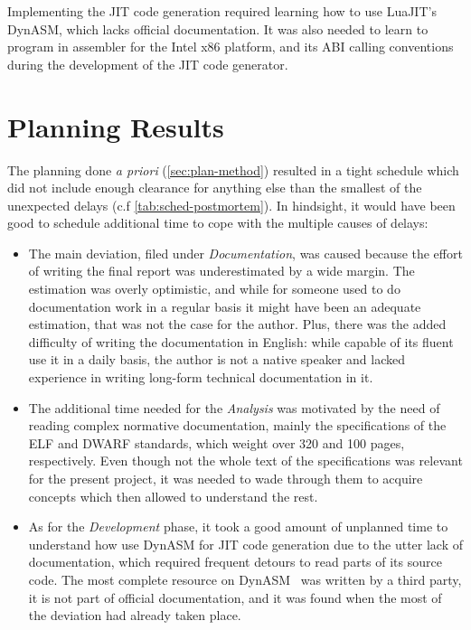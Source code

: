 Implementing the JIT code generation required learning how to use LuaJIT's
DynASM, which lacks official documentation. It was also needed to learn to
program in assembler for the Intel x86 platform, and its \gls{ABI} calling
conventions during the development of the JIT code generator.


\section{Planning Results}

The planning done \emph{a priori} (\autoref{sec:plan-method}) resulted in a
tight schedule which did not include enough clearance for anything else than
the smallest of the unexpected delays (c.f \autoref{tab:sched-postmortem}).
In hindsight, it would have been good to schedule additional time to cope
with the multiple causes of delays:

\begin{itemize}

	\item The main deviation, filed under \emph{Documentation}, was caused
	because the effort of writing the final report was underestimated by
	a wide margin. The estimation was overly optimistic, and while for someone
	used to do documentation work in a regular basis it might have been an
	adequate estimation, that was not the case for the author. Plus, there was
	the added difficulty of writing the documentation in English: while
	capable of its fluent use it in a daily basis, the author is not a native
	speaker and lacked experience in writing long-form technical documentation
	in it.

	\item The additional time needed for the \emph{Analysis} was motivated by
	the need of reading complex normative documentation, mainly the
	specifications of the \gls{ELF} and \gls{DWARF} standards, which weight
	over 320 and 100 pages, respectively. Even though not the whole text of
	the specifications was relevant for the present project, it was needed to
	wade through them to acquire concepts which then allowed to understand the
	rest.

	\item As for the \emph{Development} phase, it took a good amount of
	unplanned time to understand how use DynASM for JIT code generation due to
	the utter lack of documentation, which required frequent detours to read
	parts of its source code. The most complete resource on
	DynASM~\cite{unofficial-dasm-doc} was written by a third party, it is not
	part of official documentation, and it was found when the most of the
	deviation had already taken place.

\end{itemize}

